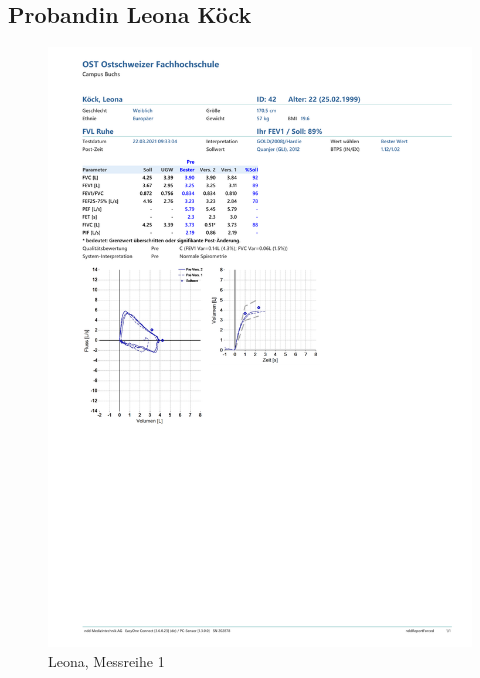 \documentclass[11pt]{scrartcl}
\begin{document}
    \pagebreak

    \subsection{Probandin Leona Köck}

    \begin{figure}[H]
        \centering
        \includegraphics[clip, trim=1cm 10cm 0cm 10.6cm, width=15cm]{Dateien/Leona1.pdf}
        \caption{Leona, Messreihe 1}
    \end{figure}
\end{document}
